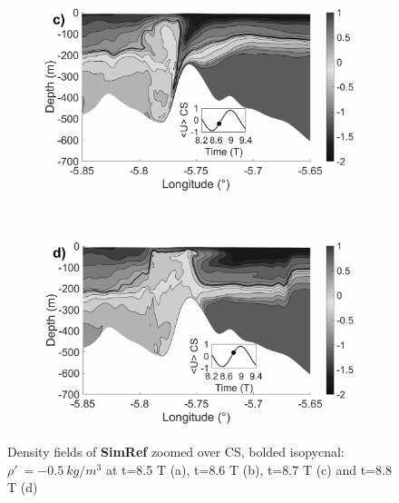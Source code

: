 \begin{figure}[!h]
\begin{subfigure}{0.5\linewidth}
\includegraphics[width=\textwidth]{./papier2D/RW_J4_11h36_deferl.png}

\end{subfigure}
 ~
\begin{subfigure}{0.5\linewidth}
\includegraphics[width=\textwidth]{./papier2D/RW_J4_13h_gen_mod1.png}

\end{subfigure}
 \caption{Density fields of \textbf{SimRef} zoomed over CS, bolded isopycnal: $\rho'\ =-0.5\ kg/m^3$ at t=8.5 T (a), t=8.6 T (b), t=8.7 T (c) and t=8.8 T (d)}
 \label{CV_ressaut}
\end{figure}
 

